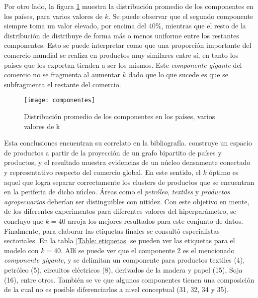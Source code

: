 \documentclass[class=article, crop=false]{standalone}
\begin{document}
Por otro lado, la figura \ref{fig:componentes} muestra la distribución promedio de los componentes en los países, para varios valores de $k$. Se puede observar que el segundo componente siempre toma un valor elevado, por encima del 40\%, mientras que el resto de la distribución de distribuye de forma más o menos uniforme entre los restantes componentes. Esto se puede interpretar como que una proporción importante del comercio mundial se realiza en productos muy similares entre sí, en tanto los países que los exportan tienden a ser los mismos. Este \textit{componente gigante} del comercio no se fragmenta al aumentar $k$ dado que lo que sucede es que se subfragmenta el restante del comercio. 

\begin{figure}[h]
	\centering	
	\texttt{[image: componentes]}
	\caption{Distribución promedio de los componentes en los países, varios valores de k}
	\label{fig:componentes}
\end{figure}

Esta conclusiones encuentran su correlato en la bibliografía. \cite{Hidalgo2007} construye un espacio de productos a partir de la proyección de un grafo bipartito de países y productos, y el resultado muestra evidencias de un núcleo densamente conectado y representativo respecto del comercio global. En este sentido, el $k$ óptimo es aquel que logra separar correctamente los clusters de productos que se encuentran en la periferia de dicho núcleo. Áreas como el \textit{petróleo}, \textit{textiles} y \textit{productos agropecuarios} deberían ser distinguibles con nitidez. Con este objetivo en mente, de los diferentes experimentos para diferentes valores del hiperparámetro, se concluyo que $k=40$ arroja los mejores resultados para este conjunto de datos.
Finalmente, para elaborar las etiquetas finales se consultó especialistas sectoriales. En la tabla \ref{Table: etiquetas} se pueden ver las etiquetas para el modelo con $k=40$. Allí se puede ver que el componente 2 es el mencionado \textit{componente gigante}, y se delimitan un componente para productos textiles (4), petróleo (5), circuitos eléctricos (8), derivados de la madera y papel (15), Soja (16), entre otros. También se ve que algunos componentes tienen una composición de la cual no es posible diferenciarlos a nivel conceptual (31, 32, 34 y 35).
\end{document}

